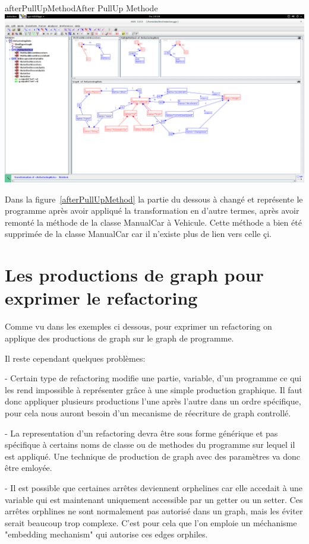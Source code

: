 \documentclass[a4paper, 12pt]{article}
\begin{document}
\begin{myfig}{afterPullUpMethod}{After PullUp Methode}
\includegraphics[width=\textwidth]{afterPullUpMethod.png}
\end{myfig}

Dans la figure~\ref{afterPullUpMethod} la partie du dessous à changé et représente le programme après avoir appliqué la transformation en d'autre termes, après avoir remonté la méthode de la classe ManualCar à Vehicule.
Cette méthode a bien été supprimée de la classe ManualCar car il n'existe plus de lien vers celle çi.

\section{Les productions de graph pour exprimer le refactoring}

Comme vu dans les exemples ci dessous, pour exprimer un refactoring on applique des productions de graph sur le graph de programme.

Il reste cependant quelques problèmes:

- Certain type de refactoring modifie une partie, variable, d'un programme ce qui les rend impossible à représenter grâce à une simple production graphique. Il faut donc appliquer plusieurs productions l'une après l'autre dans un ordre spécifique, pour cela nous auront besoin d'un mecanisme de réecriture de graph controllé.

- La representation d'un refactoring devra être sous forme générique et pas spécifique à certains noms de classe ou de methodes du programme sur lequel il est appliqué. Une technique de production de graph avec des paramètres va donc être emloyée.

- Il est possible que certaines arrêtes deviennent orphelines car elle accedait à une variable qui est maintenant uniquement accessible par un getter ou un setter. Ces arrêtes orphlines ne sont normalement pas autorisé dans un graph, mais les éviter serait beaucoup trop complexe. C'est pour cela que l'on emploie un méchanisme "embedding mechanism" qui autorise ces edges orphiles.
\end{document}
